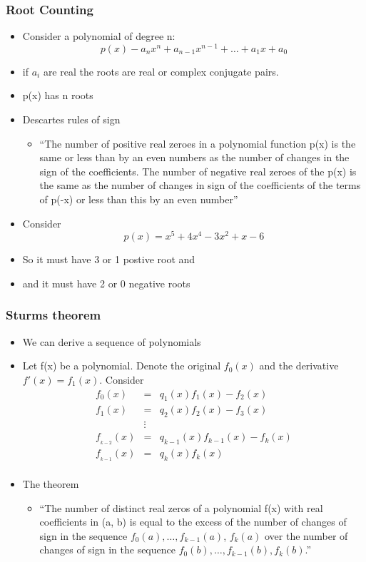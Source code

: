 \documentclass[10pt]{beamer}
\begin{document}
\begin{frame}
  \frametitle{Root Counting}
  \begin{itemize}
  \item Consider a polynomial of degree n:
    \[
      p(x) - a_n x^n + a_{n-1} x^{n-1} + \ldots + a_1 x + a_0
    \]
  \item if $a_i$ are real the roots are real or complex conjugate pairs. 
  \item p(x) has n roots
  \item Descartes rules of sign
    \begin{itemize}
    \item ``The number of positive real zeroes in a polynomial
      function p(x) is the same or less than by an even numbers as the
      number of changes in the sign of the coefficients. The number of
      negative real zeroes of the p(x) is the same as the number of
      changes in sign of the coefficients of the terms of p(-x) or
      less than this by an even number''
    \end{itemize}
  \item Consider
    \[
      p(x) = x^5 + 4 x^4 - 3 x^2 + x -6
    \]
  \item So it must have 3 or 1 postive root and
  \item and it must have 2 or 0 negative roots
  \end{itemize}
\end{frame}

\begin{frame}
  \frametitle{Sturms theorem}
  \begin{itemize}
  \item We can derive a sequence of polynomials
  \item Let f(x) be a polynomial. Denote the original $f_0(x)$ and the
    derivative $f'(x) = f_1(x)$. Consider
    \[
      \begin{array}{rcl}
        f_0(x)      &=& q_1(x) f_1(x) - f_2(x) \\
        f_1(x)      &=& q_2(x) f_2(x) - f_3(x) \\
                 &\vdots& \\
        f__{k-2}(x) &=& q_{k-1}(x) f_{k-1}(x) - f_k(x) \\
        f__{k-1}(x) &=& q_k(x) f_k(x) \\
      \end{array}
    \]
  \item The theorem
    \begin{itemize}
    \item ``The number of distinct real zeros of a polynomial f(x)
      with real coefficients in (a, b) is equal to the excess of the
      number of changes of sign in the sequence $f_0(a), \ldots ,
      f_{k−1}(a)$, $f_k(a)$ over the number of changes of sign in the
      sequence $f_0(b), \ldots , f_{k−1}(b), f_k(b)$.''
    \end{itemize}
  \end{itemize}
\end{frame}
\end{document}

